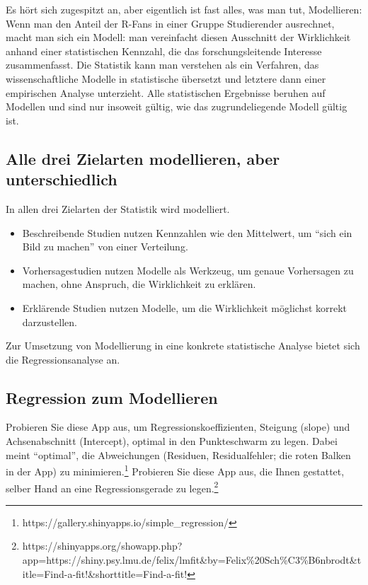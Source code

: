 \documentclass[
  ngerman,
  letterpaper,
  twoside,
  open=any]{scrbook}
\providecommand{\tightlist}{%
  \setlength{\itemsep}{0pt}\setlength{\parskip}{0pt}}\usepackage{longtable,booktabs,array}
\theoremstyle{definition}
\theoremstyle{plain}
\theoremstyle{definition}
\theoremstyle{definition}
\theoremstyle{definition}
\theoremstyle{definition}
\theoremstyle{remark}
\begin{document}
Es hört sich zugespitzt an, aber eigentlich ist fast alles, was man tut,
Modellieren: Wenn man den Anteil der R-Fans in einer Gruppe Studierender
ausrechnet, macht man sich ein Modell: man vereinfacht diesen Ausschnitt
der Wirklichkeit anhand einer statistischen Kennzahl, die das
forschungsleitende Interesse zusammenfasst. Die Statistik kann man
verstehen als ein Verfahren, das wissenschaftliche Modelle in
statistische übersetzt und letztere dann einer empirischen Analyse
unterzieht. Alle statistischen Ergebnisse beruhen auf Modellen und sind
nur insoweit gültig, wie das zugrundeliegende Modell gültig ist.

\subsection{Alle drei Zielarten modellieren, aber
unterschiedlich}\label{alle-drei-zielarten-modellieren-aber-unterschiedlich}

In allen drei Zielarten der Statistik wird modelliert.

\begin{itemize}
\tightlist
\item
  Beschreibende Studien nutzen Kennzahlen wie den Mittelwert, um
  \enquote{sich ein Bild zu machen} von einer Verteilung.
\item
  Vorhersagestudien nutzen Modelle als Werkzeug, um genaue Vorhersagen
  zu machen, ohne Anspruch, die Wirklichkeit zu erklären.
\item
  Erklärende Studien nutzen Modelle, um die Wirklichkeit möglichst
  korrekt darzustellen.
\end{itemize}

Zur Umsetzung von Modellierung in eine konkrete statistische Analyse
bietet sich die Regressionsanalyse an.

\subsection{Regression zum
Modellieren}\label{regression-zum-modellieren}

Probieren Sie diese App aus, um Regressionskoeffizienten, Steigung
(slope) und Achsenabschnitt (Intercept), optimal in den Punkteschwarm zu
legen. Dabei meint \enquote{optimal}, die Abweichungen (Residuen,
Residualfehler; die roten Balken in der App) zu minimieren.\footnote{https://gallery.shinyapps.io/simple\_regression/}
Probieren Sie diese App aus, die Ihnen gestattet, selber Hand an eine
Regressionsgerade zu legen.\footnote{https://shinyapps.org/showapp.php?app=https://shiny.psy.lmu.de/felix/lmfit\&by=Felix\%20Sch\%C3\%B6nbrodt\&title=Find-a-fit!\&shorttitle=Find-a-fit!}
\end{document}
